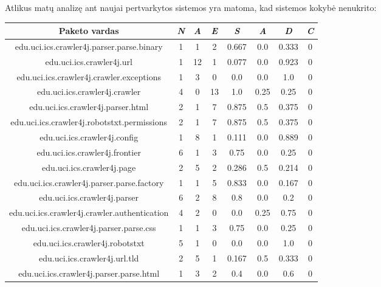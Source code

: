 Atlikus matų analizę ant naujai pertvarkytos sistemos yra matoma, kad sistemos kokybė nenukrito:
\begin{center}
    \begin{tabular}{|c|c|c|c|c|c|c|c|}
        \hline
        Paketo vardas & \textit{N} & \textit{A} & \textit{E} & \textit{S} & \textit{A} & \textit{D} & \textit{C} \\ [0.5ex]
        \hline\hline
        edu.uci.ics.crawler4j.parser.parse.binary & 1 & 1 & 2 & 0.667 & 0.0 & 0.333 & 0\\
        \hline
        edu.uci.ics.crawler4j.url & 1 & 12 & 1 & 0.077 & 0.0 & 0.923 & 0\\
        \hline
        edu.uci.ics.crawler4j.crawler.exceptions & 1 & 3 & 0 & 0.0 & 0.0 & 1.0 & 0 \\
        \hline
        edu.uci.ics.crawler4j.crawler & 4 & 0 & 13 & 1.0 & 0.25 & 0.25 & 0  \\
        \hline
        edu.uci.ics.crawler4j.parser.html & 2 & 1 & 7 & 0.875 & 0.5 & 0.375 & 0 \\
        \hline
        edu.uci.ics.crawler4j.robotstxt.permissions & 2 & 1 & 7 & 0.875 & 0.5 & 0.375 & 0\\
        \hline
        edu.uci.ics.crawler4j.config & 1 & 8 & 1 & 0.111 & 0.0 & 0.889 & 0 \\
        \hline
        edu.uci.ics.crawler4j.frontier & 6 & 1 & 3 & 0.75 & 0.0 & 0.25 & 0  \\
        \hline
        edu.uci.ics.crawler4j.page & 2 & 5 & 2 & 0.286 & 0.5 & 0.214 & 0 \\
        \hline
        edu.uci.ics.crawler4j.parser.parse.factory & 1 & 1 & 5 & 0.833 & 0.0 & 0.167 & 0 \\
        \hline
        edu.uci.ics.crawler4j.parser & 6 & 2 & 8 & 0.8 & 0.0 & 0.2 &0 \\
        \hline
        edu.uci.ics.crawler4j.crawler.authentication & 4 & 2 & 0 & 0.0 & 0.25 & 0.75 & 0 \\
        \hline
        edu.uci.ics.crawler4j.parser.parse.css & 1 & 1 & 3 & 0.75 & 0.0 & 0.25 & 0\\
        \hline
        edu.uci.ics.crawler4j.robotstxt & 5 & 1 & 0 & 0.0 & 0.0 & 1.0 & 0 \\
        \hline
        edu.uci.ics.crawler4j.url.tld & 2 & 5 & 1 & 0.167 & 0.5 & 0.333 & 0 \\
        \hline
        edu.uci.ics.crawler4j.parser.parse.html & 1 & 3 & 2 & 0.4 & 0.0 & 0.6 & 0\\

\end{tabular}
\end{center}
